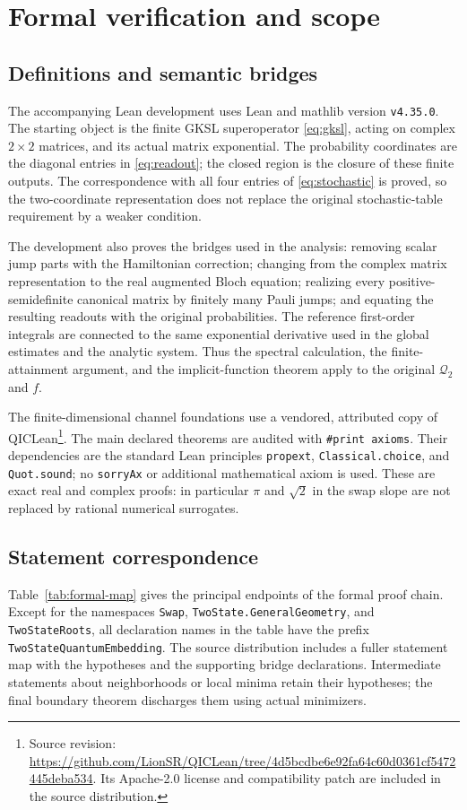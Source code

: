 \documentclass[11pt]{article}
\theoremstyle{definition}
\theoremstyle{remark}
\newcommand{\Q}{\mathcal Q_2}
\begin{document}
\section{Formal verification and scope}\label{sec:formal}

\subsection{Definitions and semantic bridges}
The accompanying Lean development uses Lean and mathlib version \texttt{v4.35.0}. The starting object is the finite GKSL superoperator \eqref{eq:gksl}, acting on complex \(2\times2\) matrices, and its actual matrix exponential. The probability coordinates are the diagonal entries in \eqref{eq:readout}; the closed region is the closure of these finite outputs. The correspondence with all four entries of \eqref{eq:stochastic} is proved, so the two-coordinate representation does not replace the original stochastic-table requirement by a weaker condition.

The development also proves the bridges used in the analysis: removing scalar jump parts with the Hamiltonian correction; changing from the complex matrix representation to the real augmented Bloch equation; realizing every positive-semidefinite canonical matrix by finitely many Pauli jumps; and equating the resulting readouts with the original probabilities. The reference first-order integrals are connected to the same exponential derivative used in the global estimates and the analytic system. Thus the spectral calculation, the finite-attainment argument, and the implicit-function theorem apply to the original \(\Q\) and \(f\).

The finite-dimensional channel foundations use a vendored, attributed copy of QICLean\footnote{Source revision: \url{https://github.com/LionSR/QICLean/tree/4d5bcdbe6e92fa64c60d0361cf5472445deba534}. Its Apache-2.0 license and compatibility patch are included in the source distribution.}. The main declared theorems are audited with \texttt{\#print axioms}. Their dependencies are the standard Lean principles \texttt{propext}, \texttt{Classical.choice}, and \texttt{Quot.sound}; no \texttt{sorryAx} or additional mathematical axiom is used. These are exact real and complex proofs: in particular \(\pi\) and \(\sqrt2\) in the swap slope are not replaced by rational numerical surrogates.

\subsection{Statement correspondence}
Table~\ref{tab:formal-map} gives the principal endpoints of the formal proof chain. Except for the namespaces \texttt{Swap}, \texttt{TwoState.GeneralGeometry}, and \texttt{TwoStateRoots}, all declaration names in the table have the prefix \texttt{TwoStateQuantumEmbedding}. The source distribution includes a fuller statement map with the hypotheses and the supporting bridge declarations. Intermediate statements about neighborhoods or local minima retain their hypotheses; the final boundary theorem discharges them using actual minimizers.
\end{document}
